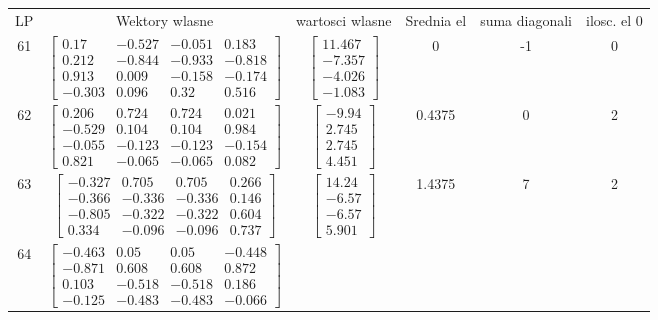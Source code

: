 \documentclass[a4paper,12pt]{article}
\begin{document}
\bgroup {} \vspace{0.2in} \begin{tabular}{c c c c c c}
LP &Wektory wlasne & wartosci wlasne & Srednia el & suma diagonali & ilosc. el 0\\
61
&
$\begin{bmatrix} 0.17 & -0.527 & -0.051 & 0.183 \\ 0.212 & -0.844 & -0.933 & -0.818 \\ 0.913 & 0.009 & -0.158 & -0.174 \\ -0.303 & 0.096 & 0.32 & 0.516 \end{bmatrix}$
&
$\begin{bmatrix} 11.467 \\ -7.357 \\ -4.026 \\ -1.083 \end{bmatrix}$
&
0
&
-1
&
0
\\
62
&
$\begin{bmatrix} 0.206 & 0.724 & 0.724 & 0.021 \\ -0.529 & 0.104 & 0.104 & 0.984 \\ -0.055 & -0.123 & -0.123 & -0.154 \\ 0.821 & -0.065 & -0.065 & 0.082 \end{bmatrix}$
&
$\begin{bmatrix} -9.94 \\ 2.745 \\ 2.745 \\ 4.451 \end{bmatrix}$
&
0.4375
&
0
&
2
\\
63
&
$\begin{bmatrix} -0.327 & 0.705 & 0.705 & 0.266 \\ -0.366 & -0.336 & -0.336 & 0.146 \\ -0.805 & -0.322 & -0.322 & 0.604 \\ 0.334 & -0.096 & -0.096 & 0.737 \end{bmatrix}$
&
$\begin{bmatrix} 14.24 \\ -6.57 \\ -6.57 \\ 5.901 \end{bmatrix}$
&
1.4375
&
7
&
2
\\
64
&
$\begin{bmatrix} -0.463 & 0.05 & 0.05 & -0.448 \\ -0.871 & 0.608 & 0.608 & 0.872 \\ 0.103 & -0.518 & -0.518 & 0.186 \\ -0.125 & -0.483 & -0.483 & -0.066 \end{bmatrix}$

\end{tabular}
\end{document}
